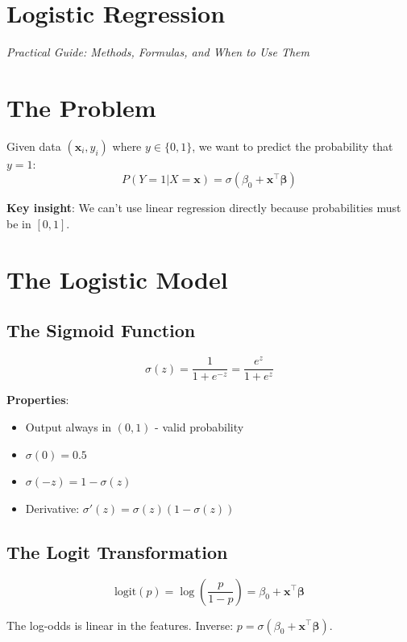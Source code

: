 \documentclass[main.tex]{subfiles}
\begin{document}
\section*{\Huge\textcolor{mantis}{Logistic Regression}}
\vspace{-0.3cm}
{\large\textit{Practical Guide: Methods, Formulas, and When to Use Them}}
\vspace{0.5cm}

\section{The Problem}

Given data $(\mathbf{x}_i, y_i)$ where $y \in \{0, 1\}$, we want to predict the probability that $y = 1$:
$$P(Y = 1 | X = \mathbf{x}) = \sigma(\beta_0 + \mathbf{x}^\top\boldsymbol{\beta})$$

\textbf{Key insight}: We can't use linear regression directly because probabilities must be in $[0, 1]$.

\section{The Logistic Model}

\subsection{The Sigmoid Function}

$$\boxed{\sigma(z) = \frac{1}{1 + e^{-z}} = \frac{e^z}{1 + e^z}}$$

\textbf{Properties}:
\begin{itemize}
    \item Output always in $(0, 1)$ - valid probability
    \item $\sigma(0) = 0.5$
    \item $\sigma(-z) = 1 - \sigma(z)$
    \item Derivative: $\sigma'(z) = \sigma(z)(1 - \sigma(z))$
\end{itemize}

\subsection{The Logit Transformation}

$$\boxed{\text{logit}(p) = \log\left(\frac{p}{1-p}\right) = \beta_0 + \mathbf{x}^\top\boldsymbol{\beta}}$$

The log-odds is linear in the features. Inverse: $p = \sigma(\beta_0 + \mathbf{x}^\top\boldsymbol{\beta})$.
\end{document}
